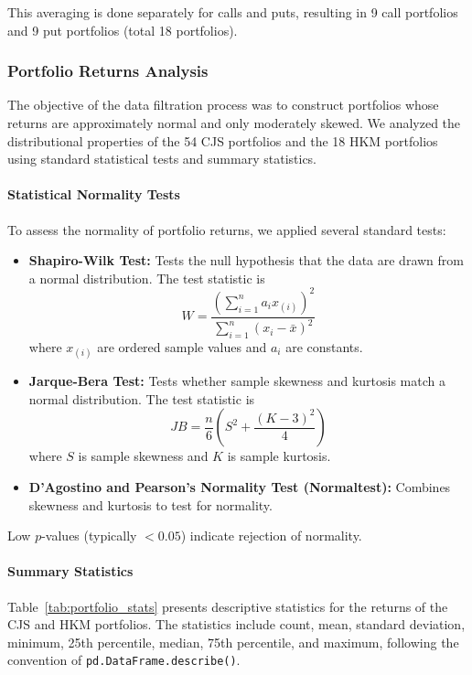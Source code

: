 \documentclass{article}
\begin{document}
\begin{appendices}
This averaging is done separately for calls and puts, resulting in 9 call portfolios and 9 put portfolios (total 18 portfolios).



\subsubsection*{Portfolio Returns Analysis}

The objective of the data filtration process was to construct portfolios whose returns are approximately normal and only moderately skewed. We analyzed the distributional properties of the 54 CJS portfolios and the 18 HKM portfolios using standard statistical tests and summary statistics.

\paragraph{Statistical Normality Tests}
To assess the normality of portfolio returns, we applied several standard tests:
\begin{itemize}
  \item \textbf{Shapiro-Wilk Test:} Tests the null hypothesis that the data are drawn from a normal distribution. The test statistic is
  \[
  W = \frac{\left( \sum_{i=1}^n a_i x_{(i)} \right)^2}{\sum_{i=1}^n (x_i - \bar{x})^2}
  \]
  where $x_{(i)}$ are ordered sample values and $a_i$ are constants.
  \item \textbf{Jarque-Bera Test:} Tests whether sample skewness and kurtosis match a normal distribution. The test statistic is
  \[
  JB = \frac{n}{6} \left( S^2 + \frac{(K-3)^2}{4} \right)
  \]
  where $S$ is sample skewness and $K$ is sample kurtosis.
  \item \textbf{D'Agostino and Pearson's Normality Test (Normaltest):} Combines skewness and kurtosis to test for normality.
\end{itemize}
Low $p$-values (typically $<0.05$) indicate rejection of normality.

\paragraph{Summary Statistics}
Table~\ref{tab:portfolio_stats} presents descriptive statistics for the returns of the CJS and HKM portfolios. The statistics include count, mean, standard deviation, minimum, 25th percentile, median, 75th percentile, and maximum, following the convention of \texttt{pd.DataFrame.describe()}.


\end{appendices}
\end{document}
